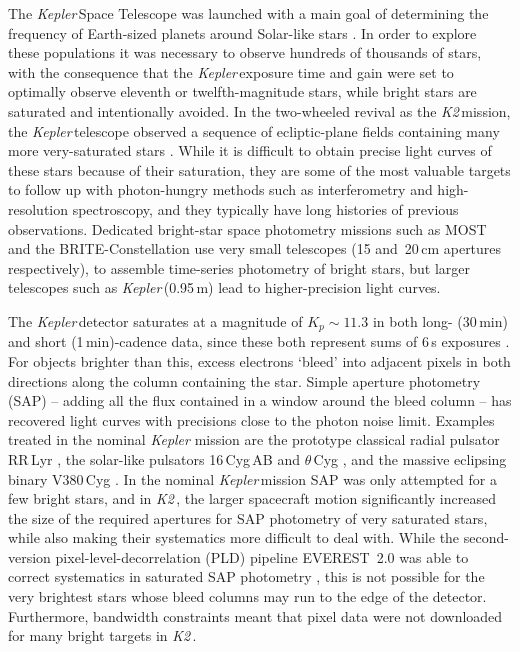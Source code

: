 \documentclass[modern]{aastex62}
\newcommand\kepler{\emph{Kepler}\,}
\newcommand\ktwo{\emph{K2}\,}
\begin{document}
The \kepler Space Telescope was launched with a main goal of determining the frequency of Earth-sized planets around Solar-like stars \citep{2010sci...327..977b}. In order to explore these populations it was necessary to observe hundreds of thousands of stars, with the consequence that the \kepler exposure time and gain were set to optimally observe eleventh or twelfth-magnitude stars, while bright stars are saturated and intentionally avoided. In the two-wheeled revival as the \ktwo mission, the \kepler telescope observed a sequence of ecliptic-plane fields containing many more very-saturated stars \citep{2014PASP..126..398H}. While it is difficult to obtain precise light curves of these stars because of their saturation, they are some of the most valuable targets to follow up with photon-hungry methods such as interferometry and high-resolution spectroscopy, and they typically have long histories of previous observations. Dedicated bright-star space photometry missions such as MOST \citep{most} and the BRITE-Constellation \citep{brite,brite2} use very small telescopes (15 and~20\,cm apertures respectively), to assemble time-series photometry of bright stars, but larger telescopes such as \kepler (0.95\,m) lead to higher-precision light curves.

The \kepler detector saturates at a magnitude of $K_p \sim 11.3$ in both long- (30\,min) and short (1\,min)-cadence data, since these both represent sums of 6\,s exposures \citep{Gilliland2010}. For objects brighter than this, excess electrons `bleed' into adjacent pixels in both directions along the column containing the star. Simple aperture photometry (SAP) -- adding all the flux contained in a window around the bleed column -- has recovered light curves with precisions close to the photon noise limit. Examples treated in the nominal {\it Kepler\/} mission are the prototype classical radial pulsator RR\,Lyr \citep[$V=7.2$;][]{Kolenberg2011}, the solar-like pulsators 16\,Cyg\,AB \citep[$V\approx 6$;][]{2013MNRAS.433.1262W} and $\theta\,$Cyg \citep[$V=4.48$;][]{Guzik2016}, and the massive eclipsing binary V380\,Cyg \citep[$V=5.68$;][]{tkachenko2014}. In the nominal \kepler mission SAP was only attempted for a few bright stars, and in \ktwo, the larger spacecraft motion significantly increased the size of the required apertures for SAP photometry of very saturated stars, while also making their systematics more difficult to deal with. While the second-version pixel-level-decorrelation (PLD) pipeline EVEREST~2.0 was able to correct systematics in saturated SAP photometry \citep{everest2}, this is not possible for the very brightest stars whose bleed columns may run to the edge of the detector. Furthermore, bandwidth constraints meant that pixel data were not downloaded for many bright targets in \ktwo. 
\end{document}
